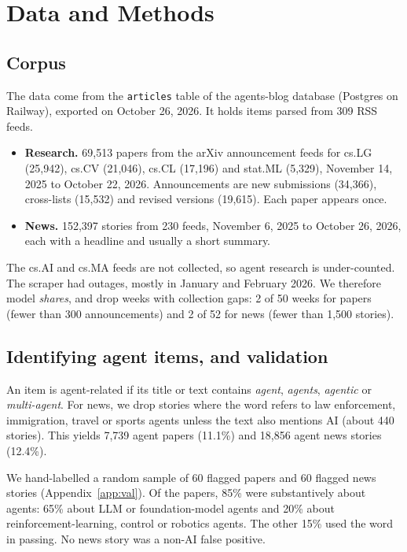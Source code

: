 \documentclass[10.5pt]{article}
\begin{document}
\section{Data and Methods}

\subsection{Corpus}

The data come from the \texttt{articles} table of the agents-blog database (Postgres on Railway), exported on October 26, 2026. It holds items parsed from 309 RSS feeds.
\begin{itemize}
  \item \textbf{Research.} 69,513 papers from the arXiv announcement feeds for cs.LG (25,942), cs.CV (21,046), cs.CL (17,196) and stat.ML (5,329), November 14, 2025 to October 22, 2026. Announcements are new submissions (34,366), cross-lists (15,532) and revised versions (19,615). Each paper appears once.
  \item \textbf{News.} 152,397 stories from 230 feeds, November 6, 2025 to October 26, 2026, each with a headline and usually a short summary.
\end{itemize}
The cs.AI and cs.MA feeds are not collected, so agent research is under-counted. The scraper had outages, mostly in January and February 2026. We therefore model \emph{shares}, and drop weeks with collection gaps: 2 of 50 weeks for papers (fewer than 300 announcements) and 2 of 52 for news (fewer than 1,500 stories).

\subsection{Identifying agent items, and validation}

An item is agent-related if its title or text contains \textit{agent}, \textit{agents}, \textit{agentic} or \textit{multi-agent}. For news, we drop stories where the word refers to law enforcement, immigration, travel or sports agents unless the text also mentions AI (about 440 stories). This yields 7,739 agent papers (11.1\%) and 18,856 agent news stories (12.4\%).

We hand-labelled a random sample of 60 flagged papers and 60 flagged news stories (Appendix~\ref{app:val}). Of the papers, 85\% were substantively about agents: 65\% about LLM or foundation-model agents and 20\% about reinforcement-learning, control or robotics agents. The other 15\% used the word in passing. No news story was a non-AI false positive.
\end{document}
